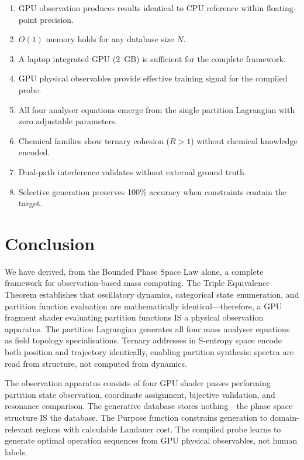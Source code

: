 \documentclass[11pt,twocolumn,a4paper]{article}
\theoremstyle{definition}
\theoremstyle{remark}
\begin{document}
\begin{enumerate}[nosep]
\item GPU observation produces results identical to CPU reference within floating-point precision.
\item $O(1)$ memory holds for any database size $N$.
\item A laptop integrated GPU (2~GB) is sufficient for the complete framework.
\item GPU physical observables provide effective training signal for the compiled probe.
\item All four analyser equations emerge from the single partition Lagrangian with zero adjustable parameters.
\item Chemical families show ternary cohesion ($R > 1$) without chemical knowledge encoded.
\item Dual-path interference validates without external ground truth.
\item Selective generation preserves 100\% accuracy when constraints contain the target.
\end{enumerate}

\section{Conclusion}
\label{sec:conclusion}

We have derived, from the Bounded Phase Space Law alone, a complete framework for observation-based mass computing. The Triple Equivalence Theorem establishes that oscillatory dynamics, categorical state enumeration, and partition function evaluation are mathematically identical---therefore, a GPU fragment shader evaluating partition functions IS a physical observation apparatus. The partition Lagrangian generates all four mass analyser equations as field topology specialisations. Ternary addresses in S-entropy space encode both position and trajectory identically, enabling partition synthesis: spectra are read from structure, not computed from dynamics.

The observation apparatus consists of four GPU shader passes performing partition state observation, coordinate assignment, bijective validation, and resonance comparison. The generative database stores nothing---the phase space structure IS the database. The Purpose function constrains generation to domain-relevant regions with calculable Landauer cost. The compiled probe learns to generate optimal operation sequences from GPU physical observables, not human labels.
\end{document}

